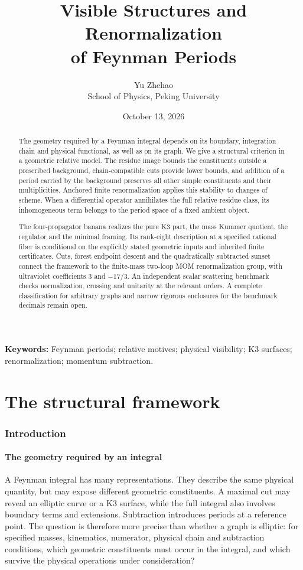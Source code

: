 \documentclass[11pt,a4paper,oneside]{article}
\title{Visible Structures and Renormalization\\of Feynman Periods}
\author{Yu Zhehao\\[4pt]\small School of Physics, Peking University}
\date{October 13, 2026}
\theoremstyle{plain}
\theoremstyle{definition}
\theoremstyle{remark}
\numberwithin{equation}{section}
\begin{document}
\maketitle
\begin{abstract}
The geometry required by a Feynman integral depends on its boundary, integration chain and physical functional, as well as on its graph. We give a structural criterion in a geometric relative model. The residue image bounds the constituents outside a prescribed background, chain-compatible cuts provide lower bounds, and addition of a period carried by the background preserves all other simple constituents and their multiplicities. Anchored finite renormalization applies this stability to changes of scheme. When a differential operator annihilates the full relative residue class, its inhomogeneous term belongs to the period space of a fixed ambient object.

The four-propagator banana realizes the pure K3 part, the mass Kummer quotient, the regulator and the minimal framing. Its rank-eight description at a specified rational fiber is conditional on the explicitly stated geometric inputs and inherited finite certificates. Cuts, forest endpoint descent and the quadratically subtracted sunset connect the framework to the finite-mass two-loop MOM renormalization group, with ultraviolet coefficients $3$ and $-17/3$. An independent scalar scattering benchmark checks normalization, crossing and unitarity at the relevant orders. A complete classification for arbitrary graphs and narrow rigorous enclosures for the benchmark decimals remain open.
\end{abstract}
\noindent\textbf{Keywords:} Feynman periods; relative motives; physical visibility; K3 surfaces; renormalization; momentum subtraction.
\tableofcontents
\part{The structural framework}

\section{Introduction}\label{ch:intro}
\subsection{The geometry required by an integral}
A Feynman integral has many representations. They describe the same physical quantity, but may expose different geometric constituents. A maximal cut may reveal an elliptic curve or a K3 surface, while the full integral also involves boundary terms and extensions. Subtraction introduces periods at a reference point. The question is therefore more precise than whether a graph is elliptic: for specified masses, kinematics, numerator, physical chain and subtraction conditions, which geometric constituents must occur in the integral, and which survive the physical operations under consideration?
\end{document}
